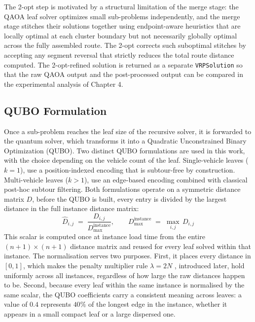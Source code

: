 \documentclass[a4paper]{report}
\begin{document}
{\begin{itemize}
The 2-opt step is motivated by a structural limitation of the merge stage: the QAOA leaf solver optimizes small sub-problems independently, and the merge stage stitches their solutions together using endpoint-aware heuristics that are locally optimal at each cluster boundary but not necessarily globally optimal across the fully assembled route. The 2-opt corrects such suboptimal stitches by accepting any segment reversal that strictly reduces the total route distance computed. The 2-opt-refined solution is returned as a separate \texttt{VRPSolution} so that the raw QAOA output and the post-processed output can be compared in the experimental analysis of Chapter 4.


\subsection{QUBO Formulation}
\label{sec:qubo-formulation}
 
Once a sub-problem reaches the leaf size of the recursive solver, it is
forwarded to the quantum solver, which transforms it into a Quadratic
Unconstrained Binary Optimization (QUBO). Two distinct QUBO formulations are used in this work, with the choice depending on the vehicle count of
the leaf. Single-vehicle leaves ($k=1$), use a
position-indexed encoding that is subtour-free by construction. Multi-vehicle leaves ($k>1$), use an edge-based encoding combined with classical
post-hoc subtour filtering.
Both formulations operate on a symmetric distance matrix $D$, before
the QUBO is built, every entry is divided by the largest distance
in the full instance distance matrix:
\begin{equation}
\hat{D}_{i,j} \;=\; \frac{D_{i,j}}{D_{\max}^{\text{instance}}},
\qquad
D_{\max}^{\text{instance}} \;=\; \max_{i,j}\, D_{i,j}
\label{eq:dist-norm}
\end{equation}
This scalar is computed once at instance load time from the entire
$(n+1)\times(n+1)$ distance matrix and reused for every leaf solved
within that instance. The normalisation serves two purposes. First,
it places every distance in $[0, 1]$, which makes the penalty
multiplier rule $\lambda = 2N$ , introduced later, hold uniformly across all instances, regardless of how large the raw
distances happen to be. Second, because every leaf within the same
instance is normalised by the same scalar, the QUBO coefficients
carry a consistent meaning across leaves: a value of $0.4$ represents
$40\%$ of the longest edge in the instance, whether it appears in a
small compact leaf or a large dispersed one.


\end{itemize}}
\end{document}
